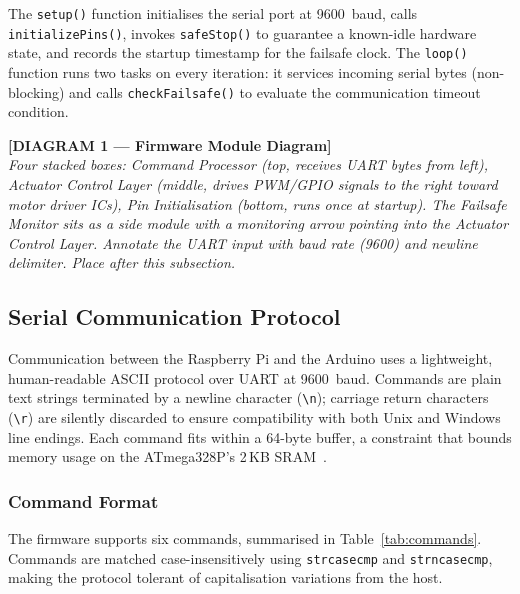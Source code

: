The \texttt{setup()} function initialises the serial port at 9600~baud,
calls \texttt{initializePins()}, invokes \texttt{safeStop()} to
guarantee a known-idle hardware state, and records the startup
timestamp for the failsafe clock. The \texttt{loop()} function runs
two tasks on every iteration: it services incoming serial bytes
(non-blocking) and calls \texttt{checkFailsafe()} to evaluate the
communication timeout condition.

\bigskip
\noindent\textbf{[DIAGRAM 1 — Firmware Module Diagram]}\\
\textit{Four stacked boxes: Command Processor (top, receives UART
bytes from left), Actuator Control Layer (middle, drives PWM/GPIO
signals to the right toward motor driver ICs), Pin Initialisation
(bottom, runs once at startup). The Failsafe Monitor sits as a side
module with a monitoring arrow pointing into the Actuator Control
Layer. Annotate the UART input with baud rate (9600) and newline
delimiter. Place after this subsection.}
\bigskip

\subsection{Serial Communication Protocol}
\label{sec:serial_protocol}

Communication between the Raspberry Pi and the Arduino uses a
lightweight, human-readable ASCII protocol over UART at 9600~baud.
Commands are plain text strings terminated by a newline character
(\texttt{\textbackslash n}); carriage return characters
(\texttt{\textbackslash r}) are silently discarded to ensure
compatibility with both Unix and Windows line endings. Each command
fits within a 64-byte buffer, a constraint that bounds memory usage
on the ATmega328P's 2\,KB SRAM~\cite{atmel2015atmega328p}.

\subsubsection{Command Format}

The firmware supports six commands, summarised in
Table~\ref{tab:commands}. Commands are matched case-insensitively
using \texttt{strcasecmp} and \texttt{strncasecmp}, making the
protocol tolerant of capitalisation variations from the host.

